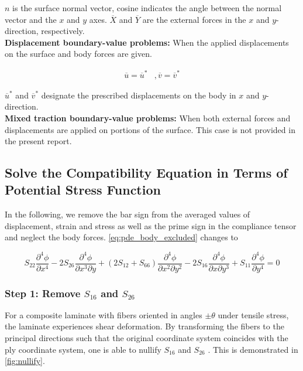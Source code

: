 \documentclass{article}
\begin{document}
$n$ is the surface normal vector, cosine indicates the angle between the normal vector and the $x$ and $y$ axes. $\overline{X}$ and $\overline{Y}$ are the external forces in the $x$ and $y$-direction, respectively. \\

\textbf{Displacement boundary-value problems:} When the applied displacements on the surface and body forces are given.

\begin{equation}
    \begin{matrix}
    \overline{u} = \overline{u}^* & , 
    \overline{v} = \overline{v}^*
    \end{matrix}
    \label{eq:average_prescribed_displ}
\end{equation}

$\overline{u}^*$ and $\overline{v}^*$ designate the prescribed displacements on the body in $x$ and $y$-direction. \\

\textbf{Mixed traction boundary-value problems:} When both external forces and displacements are applied on portions of the surface. This case is not provided in the present report.

\subsection{Solve the Compatibility Equation in Terms of Potential Stress Function} \label{sec:solve_pde}
In the following, we remove the bar sign from the averaged values of displacement, strain and stress as well as the prime sign in the compliance tensor and neglect the body forces. \cref{eq:pde_body_excluded} changes to

\begin{equation}
    S_{22} \frac{\partial^4 \phi}{\partial x^4} - 2 S_{26} \frac{\partial^4 \phi}{\partial x^3 \partial y} + (2 S_{12} + S_{66}) \frac{\partial^4 \phi}{\partial x^2 \partial y^2} - 2 S_{16} \frac{\partial^4 \phi}{\partial x \partial y^3} + S_{11} \frac{\partial^4 \phi}{\partial y^4} = 0
    \label{eq:pde_body_excluded_rewrite}
\end{equation}

\subsubsection{Step 1: Remove \texorpdfstring{$S_{16}$}{} and \texorpdfstring{$S_{26}$}{}}
For a composite laminate with fibers oriented in angles $\pm\theta$ under tensile stress, the laminate experiences shear deformation. By transforming the fibers to the principal directions such that the original coordinate system coincides with the ply coordinate system, one is able to nullify $S_{16}$ and $S_{26}$ \cite{Kassapoglou2015}. This is demonstrated in \cref{fig:nullify}. \\
\end{document}

